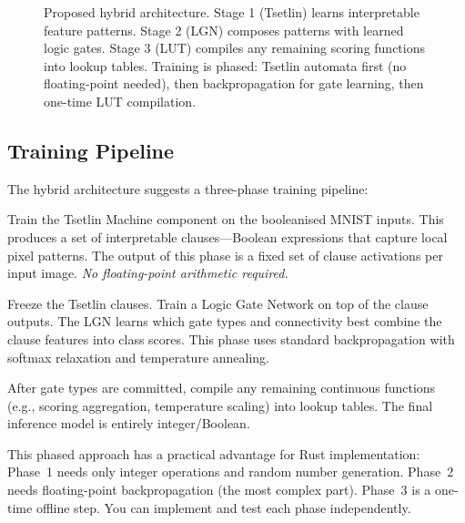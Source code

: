 \begin{figure}[htbp]
\caption{Proposed hybrid architecture. Stage 1 (Tsetlin) learns
  interpretable feature patterns. Stage 2 (LGN) composes patterns with
  learned logic gates. Stage 3 (LUT) compiles any remaining scoring
  functions into lookup tables. Training is phased: Tsetlin automata
  first (no floating-point needed), then backpropagation for gate
  learning, then one-time LUT compilation.}
\label{fig:hybrid-architecture}
\end{figure}

\subsection{Training Pipeline}

The hybrid architecture suggests a three-phase training pipeline:

\begin{description}[leftmargin=1em]
  \item[Phase 1: Clause learning (Tsetlin).]
    Train the Tsetlin Machine component on the booleanised MNIST
    inputs. This produces a set of interpretable clauses---Boolean
    expressions that capture local pixel patterns. The output of this
    phase is a fixed set of clause activations per input image.
    \emph{No floating-point arithmetic required.}

  \item[Phase 2: Gate learning (LGN).]
    Freeze the Tsetlin clauses. Train a Logic Gate Network on top
    of the clause outputs. The LGN learns which gate types and
    connectivity best combine the clause features into class scores.
    This phase uses standard backpropagation with softmax relaxation
    and temperature annealing.

  \item[Phase 3: LUT compilation.]
    After gate types are committed, compile any remaining continuous
    functions (e.g., scoring aggregation, temperature scaling) into
    lookup tables. The final inference model is entirely
    integer/Boolean.
\end{description}

\begin{engineernote}
This phased approach has a practical advantage for Rust
implementation: Phase~1 needs only integer operations and random
number generation. Phase~2 needs floating-point backpropagation
(the most complex part). Phase~3 is a one-time offline step.
You can implement and test each phase independently.
\end{engineernote}


